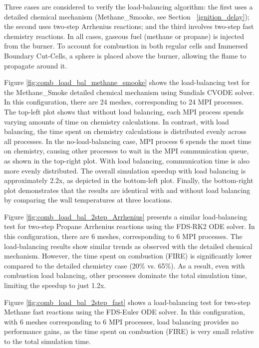 \documentclass[11pt]{book}
\begin{document}
Three cases are considered to verify the load-balancing algorithm: the first uses a detailed chemical mechanism (Methane\_Smooke, see Section ~\ref{ignition_delay}); the second uses two-step Arrhenius reactions; and the third involves two-step fast chemistry reactions. In all cases, gaseous fuel (methane or propane) is injected from the burner. To account for combustion in both regular cells and Immersed Boundary Cut-Cells, a sphere is placed above the burner, allowing the flame to propagate around it.


Figure \ref{fig:comb_load_bal_methane_smooke} shows the load-balancing test for the Methane\_Smoke detailed chemical mechanism using Sundials CVODE solver. In this configuration, there are 24 meshes, corresponding to 24 MPI processes. The top-left plot shows that without load balancing, each MPI process spends varying amounts of time on chemistry calculations. In contrast, with load balancing, the time spent on chemistry calculations is distributed evenly across all processes. In the no-load-balancing case, MPI process 6 spends the most time on chemistry, causing other processes to wait in the MPI communication queue, as shown in the top-right plot. With load balancing, communication time is also more evenly distributed. The overall simulation speedup with load balancing is approximately 2.2x, as depicted in the bottom-left plot. Finally, the bottom-right plot demonstrates that the results are identical with and without load balancing by comparing the wall temperatures at three locations.

Figure \ref{fig:comb_load_bal_2step_Arrhenius} presents a similar load-balancing test for two-step Propane Arrhenius reactions using the FDS-RK2 ODE solver. In this configuration, there are 6 meshes, corresponding to 6 MPI processes. The load-balancing results show similar trends as observed with the detailed chemical mechanism. However, the time spent on combustion (FIRE) is significantly lower compared to the detailed chemistry case (20\% vs. 65\%). As a result, even with combustion load balancing, other processes dominate the total simulation time, limiting the speedup to just 1.2x.

Figure \ref{fig:comb_load_bal_2step_fast} shows a load-balancing test for two-step Methane fast reactions using the FDS-Euler ODE solver. In this configuration, with 6 meshes corresponding to 6 MPI processes, load balancing provides no performance gains, as the time spent on combustion (FIRE) is very small relative to the total simulation time.
\end{document}
